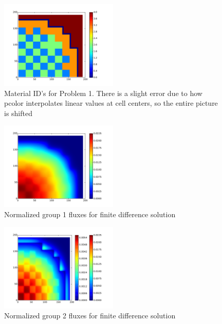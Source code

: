 \documentclass[12pt]{article}
\newenvironment{solnum}[2][Solution]{\begin{trivlist}
\item[\hskip \labelsep {\bfseries #1}\hskip \labelsep {\bfseries #2:}]\hspace{0.3in}\newline\newline}{\end{trivlist}}
\begin{document}
\begin{solnum}{1-1}
\begin{figure}
    \centering
    \caption{Material ID's for Problem 1. There is a slight error due to how pcolor
    interpolates linear values at cell centers, so the entire picture is shifted}
    \includegraphics[width=0.5\textwidth]{geometry.pdf}
\end{figure}

\begin{figure}
    \centering
    \caption{Normalized group 1 fluxes for finite difference solution}
    \includegraphics[width=0.5\textwidth]{prob1_diff_g1.pdf}
\end{figure}

\begin{figure}
    \centering
    \caption{Normalized group 2 fluxes for finite difference solution}
    \includegraphics[width=0.5\textwidth]{prob1_diff_g2.pdf}
\end{figure}


\end{solnum}
\end{document}
